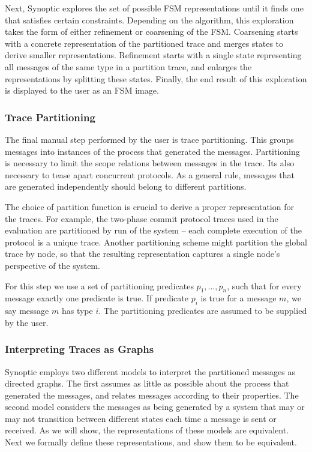 Next, Synoptic explores the set of possible FSM representations until
it finds one that satisfies certain constraints. Depending on the
algorithm, this exploration takes the form of either refinement or
coarsening of the FSM. Coarsening starts with a concrete
representation of the partitioned trace and merges states to derive
smaller representations. Refinement starts with a single state
representing all messages of the same type in a partition trace, and
enlarges the representations by splitting these states. Finally, the
end result of this exploration is displayed to the user as an FSM
image.

\subsubsection{Trace Partitioning}

The final manual step performed by the user is trace
partitioning. This groups messages into instances of the process that
generated the messages. Partitioning is necessary to limit the scope
relations between messages in the trace. Its also necessary to tease
apart concurrent protocols. As a general rule, messages that are
generated independently should belong to different partitions.

The choice of partition function is crucial to derive a proper
representation for the traces. For example, the two-phase commit
protocol traces used in the evaluation are partitioned by run of the
system -- each complete execution of the protocol is a unique
trace. Another partitioning scheme might partition the global trace by
node, so that the resulting representation captures a single node's
perspective of the system.

For this step we use a set of partitioning predicates $p_1,...,p_n$,
such that for every message exactly one predicate is true. If
predicate $p_i$ is true for a message $m$, we say message $m$ has type
$i$. The partitioning predicates are assumed to be supplied by the
user.

\subsubsection{Interpreting Traces as Graphs}

Synoptic employs two different models to interpret the partitioned
messages as directed graphs. The first assumes as little as possible
about the process that generated the messages, and relates messages
according to their properties. The second model considers the messages
as being generated by a system that may or may not transition between
different states each time a message is sent or received. As we will
show, the representations of these models are equivalent. Next we
formally define these representations, and show them to be equivalent.

